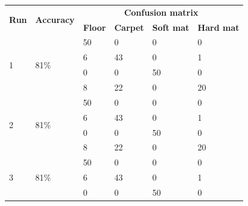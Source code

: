 \documentclass[USenglish]{ifimaster}  %
\begin{document}
\begin{table}[h]
	\centering
	\begin{tabular}{@{}llllll@{}}
		\toprule
		\multirow{2}{*}{\textbf{Run}} & \multirow{2}{*}{\textbf{Accuracy}} & \multicolumn{4}{c}{\textbf{Confusion matrix}} \\ \cmidrule(l){3-6} 
		&  & \multicolumn{1}{l|}{\textbf{Floor}} & \multicolumn{1}{l|}{\textbf{Carpet}} & \multicolumn{1}{l|}{\textbf{Soft mat}} & \textbf{Hard mat} \\ \midrule
		\multicolumn{1}{l|}{\multirow{4}{*}{1}} & \multicolumn{1}{l|}{\multirow{4}{*}{81\%}} & \multicolumn{1}{l|}{50} & \multicolumn{1}{l|}{0} & \multicolumn{1}{l|}{0} & 0 \\ \cmidrule(l){3-6} 
		\multicolumn{1}{l|}{} & \multicolumn{1}{l|}{} & \multicolumn{1}{l|}{6} & \multicolumn{1}{l|}{43} & \multicolumn{1}{l|}{0} & 1 \\ \cmidrule(l){3-6} 
		\multicolumn{1}{l|}{} & \multicolumn{1}{l|}{} & \multicolumn{1}{l|}{0} & \multicolumn{1}{l|}{0} & \multicolumn{1}{l|}{50} & 0 \\ \cmidrule(l){3-6} 
		\multicolumn{1}{l|}{} & \multicolumn{1}{l|}{} & \multicolumn{1}{l|}{8} & \multicolumn{1}{l|}{22} & \multicolumn{1}{l|}{0} & 20 \\ \midrule
		\multicolumn{1}{l|}{\multirow{4}{*}{2}} & \multicolumn{1}{l|}{\multirow{4}{*}{81\%}} & \multicolumn{1}{l|}{50} & \multicolumn{1}{l|}{0} & \multicolumn{1}{l|}{0} & 0 \\ \cmidrule(l){3-6} 
		\multicolumn{1}{l|}{} & \multicolumn{1}{l|}{} & \multicolumn{1}{l|}{6} & \multicolumn{1}{l|}{43} & \multicolumn{1}{l|}{0} & 1 \\ \cmidrule(l){3-6} 
		\multicolumn{1}{l|}{} & \multicolumn{1}{l|}{} & \multicolumn{1}{l|}{0} & \multicolumn{1}{l|}{0} & \multicolumn{1}{l|}{50} & 0 \\ \cmidrule(l){3-6} 
		\multicolumn{1}{l|}{} & \multicolumn{1}{l|}{} & \multicolumn{1}{l|}{8} & \multicolumn{1}{l|}{22} & \multicolumn{1}{l|}{0} & 20 \\ \midrule
		\multicolumn{1}{l|}{\multirow{4}{*}{3}} & \multicolumn{1}{l|}{\multirow{4}{*}{81\%}} & \multicolumn{1}{l|}{50} & \multicolumn{1}{l|}{0} & \multicolumn{1}{l|}{0} & 0 \\ \cmidrule(l){3-6} 
		\multicolumn{1}{l|}{} & \multicolumn{1}{l|}{} & \multicolumn{1}{l|}{6} & \multicolumn{1}{l|}{43} & \multicolumn{1}{l|}{0} & 1 \\ \cmidrule(l){3-6} 
		\multicolumn{1}{l|}{} & \multicolumn{1}{l|}{} & \multicolumn{1}{l|}{0} & \multicolumn{1}{l|}{0} & \multicolumn{1}{l|}{50} & 0 \\ \cmidrule(l){3-6} 

\end{tabular}
\end{table}
\end{document}
